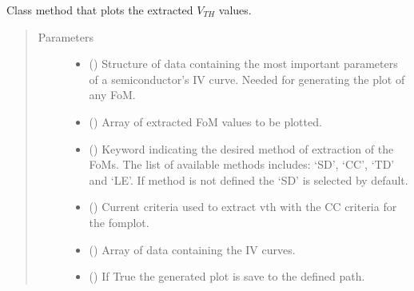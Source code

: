 \documentclass[letterpaper,10pt,english,openany, oneside]{sphinxmanual}
\begin{document}
\begin{fulllineitems}
\begin{fulllineitems}
\begin{quote}
\begin{description}
\end{description}\end{quote}

\end{fulllineitems}


\begin{fulllineitems}
\label{\detokenize{index:fompy.fom.vth_ext.plot}}
Class method that plots the extracted \(V_{TH}\) values.
\begin{quote}\begin{description}
\item[{Parameters}] \leavevmode\begin{itemize}
\item {} 
 () \textendash{} Structure of data containing the most important parameters of a semiconductor’s IV curve.
Needed for generating the plot of any FoM.

\item {} 
 () \textendash{} Array of extracted FoM values to be plotted.

\item {} 
 () \textendash{} Keyword indicating the desired method of extraction of the FoMs. The list of available methods includes: ‘SD’, ‘CC’, ‘TD’ and ‘LE’. If method is not defined the ‘SD’ is selected by default.

\item {} 
 () \textendash{} Current criteria used to extract vth with the CC criteria for the fomplot.

\item {} 
 () \textendash{} Array of data containing the IV curves.

\item {} 
 () \textendash{} If True the generated plot is save to the defined path.


\end{itemize}
\end{description}
\end{quote}
\end{fulllineitems}
\end{fulllineitems}
\end{document}
